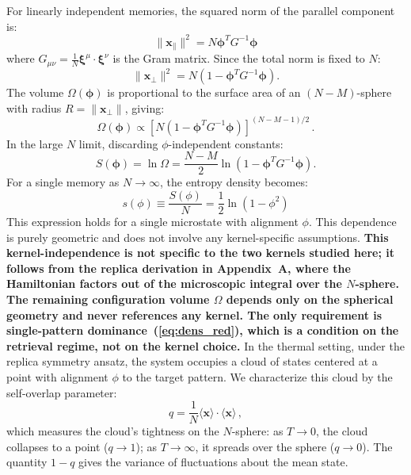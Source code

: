 \documentclass{article}
\theoremstyle{plain}
\theoremstyle{definition}
\theoremstyle{remark}
\begin{document}
For linearly independent memories, the squared norm of the parallel component is:
\begin{equation}
    \|\mathbf{x}_{\parallel}\|^2 = N \bm{\phi}^T G^{-1} \bm{\phi}
\end{equation}
where $G_{\mu\nu} = \frac{1}{N} \bm{\xi}^\mu \cdot \bm{\xi}^\nu$ is the Gram matrix. Since the total norm is fixed to $N$:
\begin{equation}
    \|\mathbf{x}_{\perp}\|^2 = N \left( 1 - \bm{\phi}^T G^{-1} \bm{\phi} \right).
\end{equation}
The volume $\Omega(\bm{\phi})$ is proportional to the surface area of an $(N-M)$-sphere with radius $R = \|\mathbf{x}_{\perp}\|$, giving:
\begin{equation}
    \Omega(\bm{\phi}) \propto \left[ N \left( 1 - \bm{\phi}^T G^{-1} \bm{\phi} \right) \right]^{(N-M-1)/2}\,.
\end{equation}
In the large $N$ limit, discarding $\phi$-independent constants:
\begin{equation}
    S(\bm{\phi}) = \ln \Omega = \frac{N-M}{2} \ln \left( 1 - \bm{\phi}^T G^{-1} \bm{\phi} \right).
\end{equation}
For a single memory as $N \to \infty$, the entropy density becomes:
\begin{equation}
    s(\phi) \equiv \frac{S(\phi)}{N} = \frac{1}{2} \ln ( 1 - \phi^2 )
	\label{eq:entropy_g}
\end{equation}
This expression holds for a single microstate with alignment $\phi$. This dependence is purely geometric and does not involve any kernel-specific assumptions. \textbf{This kernel-independence is not specific to the two kernels studied here; it follows from the replica derivation in Appendix~A, where the Hamiltonian factors out of the microscopic integral over the $N$-sphere. The remaining configuration volume $\Omega$ depends only on the spherical geometry and never references any kernel. The only requirement is single-pattern dominance~(\ref{eq:dens_red}), which is a condition on the retrieval regime, not on the kernel choice.}
In the thermal setting, under the replica symmetry ansatz, the system occupies a cloud of states centered at a point with alignment $\phi$ to the target pattern. We characterize this cloud by the self-overlap parameter:
\begin{equation}
    q = \frac{1}{N} \langle \bm{x} \rangle \cdot \langle \bm{x} \rangle\,,
\end{equation}
which measures the cloud's tightness on the $N$-sphere: as $T \to 0$, the cloud collapses to a point ($q \to 1$); as $T \to \infty$, it spreads over the sphere ($q \to 0$). The quantity $1-q$ gives the variance of fluctuations about the mean state.
\end{document}
